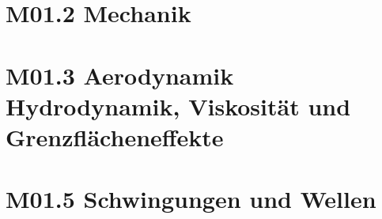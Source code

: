 \documentclass{beamer}
\begin{document}















\section{M01.2 Mechanik}

\section{M01.3 Aerodynamik Hydrodynamik, Viskosität und Grenzflächeneffekte}


\section{M01.5 Schwingungen und Wellen}
\end{document}
